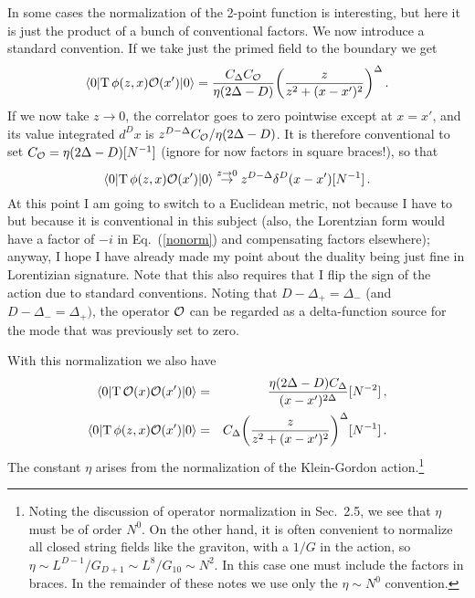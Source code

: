 \documentclass[12pt]{article}
\begin{document}
{In some cases the normalization of the 2-point function is interesting, but here it is just the product of a bunch of conventional factors.  We now introduce a standard convention.  If we take just the primed field to the boundary we get
\begin{equation}
\langle 0 | {\rm T}\, \phi(z,x) {\cal O}(x') | 0 \rangle =  \frac{C_{\Delta}C_{\cal O}}{\eta(2\Delta-D)} {\left( \frac{z}{z^2 + (x-x')^2 }\right)}^{\Delta}\,.
\end{equation}
If we now take $z \to 0$, the correlator goes to zero pointwise except at $x = x'$, and its value integrated $d^D x$ is $z^{D-\Delta} C_{\cal O} / \eta(2\Delta-D)$.  It is therefore conventional to set $C_{\cal O} = \eta(2\Delta-D)[N^{-1}]$ (ignore for now factors in square braces!), so that
\begin{equation}
\langle 0 | {\rm T}\, \phi(z,x) {\cal O}(x') | 0 \rangle \stackrel{z \to 0 }{ \to} z^{D-\Delta} \delta^{D}(x-x') [N^{-1}] \,. \label{nonorm}
\end{equation}
At this point I am going to switch to a Euclidean metric, not because I have to but because it is conventional in this subject (also, the Lorentzian form would have a factor of $-i$ in Eq.~(\ref{nonorm}) and compensating factors elsewhere); anyway, I hope I have already made my point about the duality being just fine in Lorentizian signature.  Note that this also requires that I flip the sign of the action due to standard conventions.
Noting that $D - \Delta_+ = \Delta_-$ (and $D - \Delta_- = \Delta_+)$, the operator ${\cal O}$ can be regarded as a delta-function source for the mode that was previously set to zero.  

With this normalization we also have
\begin{eqnarray}
\langle 0 | {\rm T}\, {\cal O}(x) {\cal O}(x') | 0 \rangle &=&  \frac{\eta(2\Delta - D)C_{\Delta}}{(x - x')^{2\Delta}} [N^{-2}]\,, \nonumber\\
\langle 0 | {\rm T}\, \phi(z,x) {\cal O}(x') | 0 \rangle &=& C_{\Delta} {\left( \frac{z}{z^2 + (x-x')^2 }\right)}^{\Delta} [N^{-1}]\,. \label{normed}
\end{eqnarray}
The constant $\eta$ arises from the normalization of the Klein-Gordon action.\footnote{Noting the discussion of operator normalization in Sec.~2.5, we see that $\eta$ must be of order $N^0$.  On the other hand, it is often convenient to normalize all closed string fields like the graviton, with a $1/G$ in the action, so $\eta \sim L^{D-1}/G_{D+1} \sim L^8 / G_{10} \sim N^2$.  In this case one must include the factors in braces.  In the remainder of these notes we use only the $\eta \sim N^0$ convention.}

}
\end{document}
